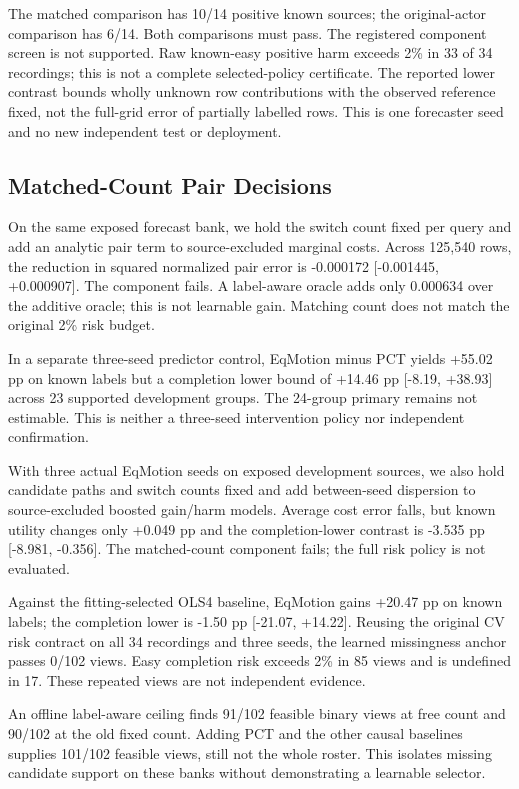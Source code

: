 \documentclass[10pt,twocolumn,letterpaper]{article}
\begin{document}
The matched comparison has 10/14 positive known sources; the original-actor comparison has 6/14. Both comparisons must pass. The registered component screen is not supported. Raw known-easy positive harm exceeds 2\% in 33 of 34 recordings; this is not a complete selected-policy certificate. The reported lower contrast bounds wholly unknown row contributions with the observed reference fixed, not the full-grid error of partially labelled rows. This is one forecaster seed and no new independent test or deployment.


\subsection{Matched-Count Pair Decisions}

On the same exposed forecast bank, we hold the switch count fixed per query and add an analytic pair term to source-excluded marginal costs. Across 125,540 rows, the reduction in squared normalized pair error is -0.000172 [-0.001445, +0.000907]. The component fails. A label-aware oracle adds only 0.000634 over the additive oracle; this is not learnable gain. Matching count does not match the original 2\% risk budget.


In a separate three-seed predictor control, EqMotion minus PCT yields +55.02 pp on known labels but a completion lower bound of +14.46 pp [-8.19, +38.93] across 23 supported development groups. The 24-group primary remains not estimable. This is neither a three-seed intervention policy nor independent confirmation.


With three actual EqMotion seeds on exposed development sources, we also hold candidate paths and switch counts fixed and add between-seed dispersion to source-excluded boosted gain/harm models. Average cost error falls, but known utility changes only +0.049 pp and the completion-lower contrast is -3.535 pp [-8.981, -0.356]. The matched-count component fails; the full risk policy is not evaluated.


Against the fitting-selected OLS4 baseline, EqMotion gains +20.47 pp on known labels; the completion lower is -1.50 pp [-21.07, +14.22]. Reusing the original CV risk contract on all 34 recordings and three seeds, the learned missingness anchor passes 0/102 views. Easy completion risk exceeds 2\% in 85 views and is undefined in 17. These repeated views are not independent evidence.


An offline label-aware ceiling finds 91/102 feasible binary views at free count and 90/102 at the old fixed count. Adding PCT and the other causal baselines supplies 101/102 feasible views, still not the whole roster. This isolates missing candidate support on these banks without demonstrating a learnable selector.
\end{document}
